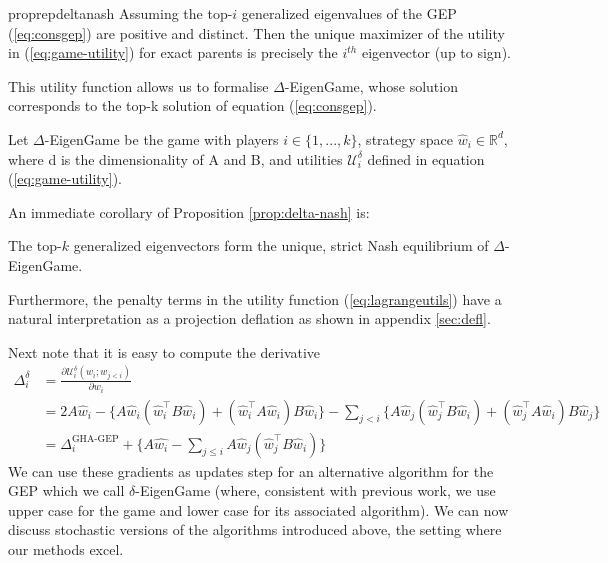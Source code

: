 \begin{restatable}{proprep}{deltanash}
\label{prop:delta-nash}
Assuming the top-$i$ generalized eigenvalues of the GEP (\ref{eq:consgep}) are positive and distinct. Then the unique maximizer of the utility in (\ref{eq:game-utility}) for exact parents is precisely the $i^{th}$ eigenvector (up to sign).
\end{restatable}

This utility function allows us to formalise $\Delta$-EigenGame, whose solution corresponds to the top-k solution of equation (\ref{eq:consgep}).

\begin{definition}
Let $\Delta$-EigenGame be the game with players $i \in \{1,...,k\}$, strategy space $\hat{w}_{i} \in \mathbb{R}^d$, where d is the dimensionality of A and B, and utilities $\mathcal{U}_{i}^{\delta}$ defined in equation (\ref{eq:game-utility}).
\end{definition}

An immediate corollary of Proposition \ref{prop:delta-nash} is:
\begin{corollary}
    The top-$k$ generalized eigenvectors form the unique, strict Nash equilibrium of $\Delta$-EigenGame.
\end{corollary}

Furthermore, the penalty terms in the utility function (\ref{eq:lagrangeutils}) have a natural interpretation as a projection deflation as shown in appendix \ref{sec:defl}.

Next note that it is easy to compute the derivative
\begin{align}\label{eq:utility-update}
    \Delta_{i}^\delta
    &=
    \frac{\partial \mathcal{U}_{i}^{\delta}(w_i ; w_{j<i})}{\partial w_i} \\
    &=
    2 A\hat{w}_{i}
    - \{ A\hat{w}_{i}(\hat{w}_{i}^{\top}B\hat{w}_{i}) + (\hat{w}_{i}^{\top}A\hat{w}_{i})B \hat{w}_{i}\}
    - \sum_{j< i} \{A\hat{w}_{j}(\hat{w}_{j}^{\top}B\hat{w}_{i}) + (\hat{w}_{j}^{\top}A\hat{w}_{i})B \hat{w}_{j}\}\nonumber\\
    &=
    \Delta_i^\text{GHA-GEP} + \{ A\hat{w_i} - \sum_{j\leq i} A\hat{w}_{j}(\hat{w}_{j}^{\top}B\hat{w}_{i})\} \nonumber
\end{align}
We can use these gradients as updates step for an alternative algorithm for the GEP which we call $\delta$-EigenGame (where, consistent with previous work, we use upper case for the game and lower case for its associated algorithm). We can now discuss stochastic versions of the algorithms introduced above, the setting where our methods excel.

